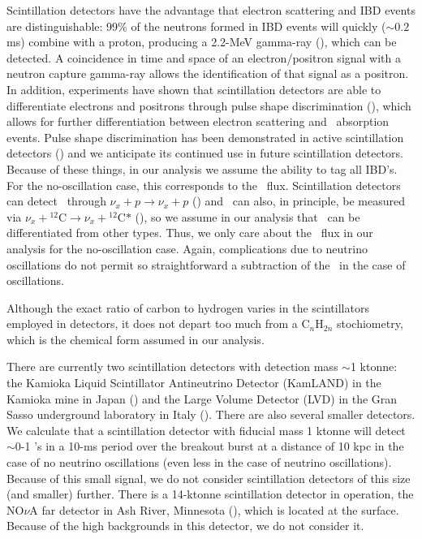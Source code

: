 Scintillation detectors have the advantage that electron
scattering 
and IBD events are distinguishable: 99\% of the neutrons formed in IBD
events will quickly (${\sim}0.2$ ms) 
combine with a proton, producing a
2.2-MeV gamma-ray (\citealt{abeetal2008}), which can be detected.  
A coincidence in time and space of an electron/positron signal with a
neutron capture gamma-ray allows the identification of that signal as
a positron.
 In addition, experiments have shown that
scintillation detectors are able to differentiate electrons
and positrons through pulse shape discrimination 
(\citealp{kinoetal2000,francoetal2011}), which
allows for further differentiation between electron scattering
and \anue\ absorption events.  Pulse shape discrimination 
has been demonstrated in active scintillation detectors
(\citealp{abeetal2014,bellinietal2014}) and we anticipate its
continued use in future scintillation detectors.  Because of these
things, in our analysis we assume the ability to tag all IBD's.  For
the no-oscillation case, this corresponds to the \anue\ flux.
Scintillation detectors can detect
\nux\ through $\nu_x + p \rightarrow \nu_x + p$
(\citealp{oberaueretal2005,lahabeacom2014}) and  \nux\ can also, in
principle, be measured via $\nu_x + {^{12}}\textrm{C} \rightarrow  
\nu_x + {^{12}}\textrm{C*}$ (\citealt{ryazhskaya1992}), so we assume in
our analysis that \nux\ can be differentiated from other types.  Thus,
we only care about the \nue\ flux in our analysis for the
no-oscillation case.  Again, complications due to neutrino
oscillations do not permit so straightforward a subtraction of the
\backgrounds\ in the case of oscillations.


Although the exact ratio of carbon to hydrogen varies in 
the scintillators employed in detectors, 
it does not depart too much from a
C$_{n}$H$_{2n}$ stochiometry, which is the chemical form 
assumed in our analysis.

There are currently two scintillation detectors with detection mass
$\sim$1 ktonne: the Kamioka Liquid Scintillator Antineutrino Detector
(KamLAND) in the Kamioka mine in Japan
(\citealt{eguchietal2003}) and the Large Volume Detector (LVD) in 
the Gran Sasso underground laboratory in 
Italy (\citealt{agliettaetal1992}). There are also several smaller detectors.
We calculate 
that a scintillation detector with fiducial mass 1 ktonne will detect 
$\sim$0-1 \nue's in a 10-ms period over the
breakout burst at a distance of 10 kpc in the case of no neutrino
oscillations (even less in the case of neutrino oscillations). 
Because of this small signal,
we do not consider scintillation detectors of this size (and smaller) further.
There is a 14-ktonne
scintillation detector in operation, the NO$\nu$A far
detector in Ash River, Minnesota
(\citealt{pattersonetal2012}), which is located at the surface.  
Because of the
high backgrounds in this detector, we do not consider it.

